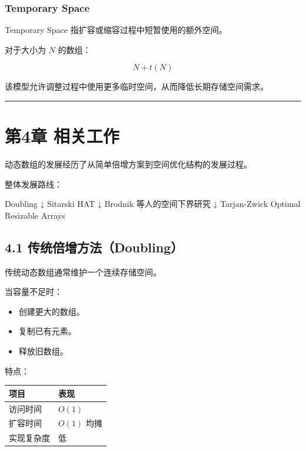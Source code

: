 \documentclass[
  UTF8,
  a4paper,
  12pt]{ctexart}
\newenvironment{Shaded}{}{}
\newcommand{\NormalTok}[1]{#1}
\newcounter{none} %
\providecommand{\tightlist}{%
  \setlength{\itemsep}{0pt}\setlength{\parskip}{0pt}}
\begin{document}
\subsubsection{Temporary Space}\label{temporary-space}

Temporary Space 指扩容或缩容过程中短暂使用的额外空间。

对于大小为 \(N\) 的数组：

\[
N+t(N)
\]

该模型允许调整过程中使用更多临时空间，从而降低长期存储空间需求。

\begin{center}\rule{0.5\linewidth}{0.5pt}\end{center}

\section{第4章 相关工作}\label{ux7b2c4ux7ae0-ux76f8ux5173ux5de5ux4f5c}

动态数组的发展经历了从简单倍增方案到空间优化结构的发展过程。

整体发展路线：

\begin{Shaded}
\begin{Highlighting}[]
\NormalTok{Doubling}
\NormalTok{    ↓}
\NormalTok{Sitarski HAT}
\NormalTok{    ↓}
\NormalTok{Brodnik 等人的空间下界研究}
\NormalTok{    ↓}
\NormalTok{Tarjan{-}Zwick Optimal Resizable Arrays}
\end{Highlighting}
\end{Shaded}

\subsection{4.1
传统倍增方法（Doubling）}\label{ux4f20ux7edfux500dux589eux65b9ux6cd5doubling}

传统动态数组通常维护一个连续存储空间。

当容量不足时：

\begin{itemize}
\tightlist
\item
  创建更大的数组。
\item
  复制已有元素。
\item
  释放旧数组。
\end{itemize}

特点：

{\def\LTcaptype{none} %
\begin{longtable}[]{@{}ll@{}}
\toprule\noalign{}
项目 & 表现 \\
\midrule\noalign{}
\endhead
\bottomrule\noalign{}
\endlastfoot
访问时间 & \(O(1)\) \\
扩容时间 & \(O(1)\) 均摊 \\
实现复杂度 & 低 \\
\end{longtable}
}
\end{document}
